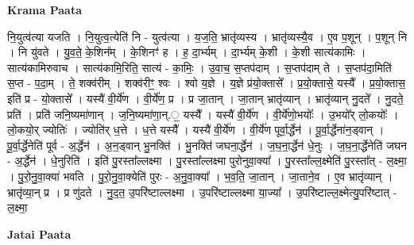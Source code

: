 \documentclass[17pt]{extarticle}
\begin{document}
\textbf{Krama Paata} \newline

नि॒युत्व॑त्या यजति । नि॒युत्व॒त्येति॑ नि - युत्व॑त्या । य॒ज॒ति॒ भ्रातृ॑व्यस्य । भ्रातृ॑व्यस्यै॒व । ए॒व प॒शून् । प॒शून् नि । नि यु॑वते । यु॒व॒ते॒ के॒शिन᳚म् । के॒शिनꣳ॑ ह । ह॒ दा॒र्भ्यम् । दा॒र्भ्यम् के॒शी । के॒शी सात्य॑कामिः । सात्य॑कामिरुवाच । सात्य॑कामि॒रिति॒ सात्य॑ - का॒मिः॒ । उ॒वा॒च॒ स॒प्तप॑दाम् । स॒प्तप॑दाम् ते । स॒प्तप॑दा॒मिति॑ स॒प्त - प॒दा॒म् । ते॒ शक्व॑रीम् । शक्व॑रीꣳ॒॒ श्वः । श्वो य॒ज्ञे । य॒ज्ञे प्र॑यो॒क्तासे᳚ । प्र॒यो॒क्तासे॒ यस्यै᳚ । प्र॒यो॒क्तास॒ इति॑ प्र - यो॒क्तासे᳚ । यस्यै॑ वी॒र्ये॑ण । वी॒र्ये॑ण॒ प्र । प्र जा॒तान् । जा॒तान् भ्रातृ॑व्यान् । भ्रातृ॑व्यान् नु॒दते᳚ । नु॒दते॒ प्रति॑ । प्रति॑ जनि॒ष्यमा॑णान् । ज॒नि॒ष्यमा॑णा॒न्.॒ यस्यै᳚ । यस्यै॑ वी॒र्ये॑ण । वी॒र्ये॑णो॒भयोः᳚ । उ॒भयो᳚र् लो॒कयोः᳚ । लो॒कयो॒र् ज्योतिः॑ । ज्योति॑र् ध॒त्ते । ध॒त्ते यस्यै᳚ । यस्यै॑ वी॒र्ये॑ण । वी॒र्ये॑ण पूर्वा॒र्द्धेन॑ । पू॒र्वा॒र्द्धेना॑न॒ड्वान् । पू॒र्वा॒र्द्धेनेति॑ पूर्व - अ॒र्द्धेन॑ । अ॒न॒ड्वान् भु॒नक्ति॑ । भु॒नक्ति॑ जघना॒र्द्धेन॑ । ज॒घ॒ना॒र्द्धेन॑ धे॒नुः । ज॒घ॒ना॒र्द्धेनेति॑ जघन - अ॒र्द्धेन॑ । धे॒नुरिति॑ । इति॑ पु॒रस्ता᳚ल्लक्ष्मा । पु॒रस्ता᳚ल्लक्ष्मा पुरोनुवा॒क्या᳚ । पु॒रस्ता᳚ल्ल॒क्ष्मेति॑ पु॒रस्ता᳚त् - ल॒क्ष्मा॒ । पु॒रो॒नु॒वा॒क्या॑ भवति । पु॒रो॒नु॒वा॒क्येति॑ पुरः - अ॒नु॒वा॒क्या᳚ । भ॒व॒ति॒ जा॒तान् । जा॒ताने॒व । ए॒व भ्रातृ॑व्यान् । भ्रातृ॑व्या॒न् प्र । प्र णु॑दते । नु॒द॒त॒ उ॒परि॑ष्टाल्लक्ष्मा । उ॒परि॑ष्टाल्लक्ष्मा या॒ज्या᳚ । उ॒परि॑ष्टाल्ल॒क्ष्मेत्यु॒परि॑ष्टात् - ल॒क्ष्मा॒ \newline

\textbf{Jatai Paata} \newline
\end{document}
